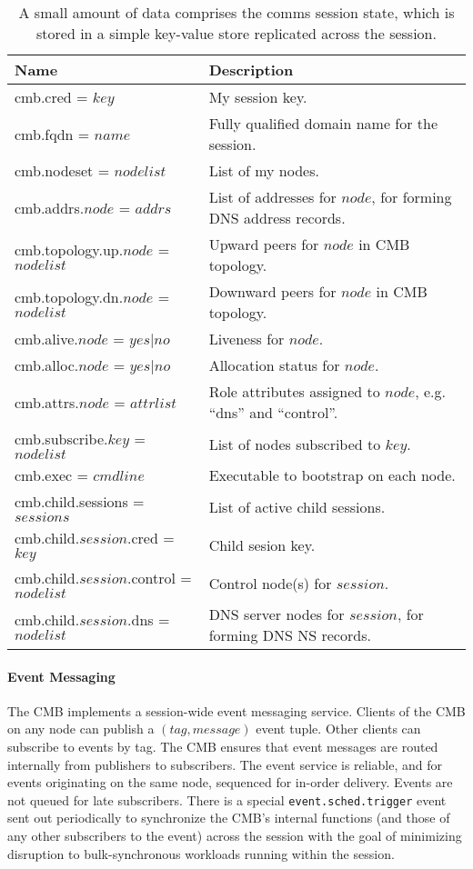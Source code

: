 \begin{table}
  \centering
  \begin{tabular}{| l | p{} |}\hline
  \textbf{Name} & \textbf{Description} \\
  \hline
  cmb.cred = $key$ &
        My session key.\\
  cmb.fqdn = $name$ &
        Fully qualified domain name for the session.\\
  cmb.nodeset = $nodelist$ &
        List of my nodes.\\
  cmb.addrs.$node$ = $addrs$ &
        List of addresses for $node$, for forming DNS address records.\\
  cmb.topology.up.$node$ = $nodelist$ & 
        Upward peers for $node$ in CMB topology.\\
  cmb.topology.dn.$node$ = $nodelist$ &
        Downward peers for $node$ in CMB topology.\\
  cmb.alive.$node$ = $yes|no$ &
        Liveness for $node$.\\
  cmb.alloc.$node$ = $yes|no$ &
        Allocation status for $node$.\\
  cmb.attrs.$node$ = $attrlist$ &
	Role attributes assigned to $node$, e.g. ``dns'' and ``control''.\\
  cmb.subscribe.$key$ = $nodelist$ &
        List of nodes subscribed to $key$.\\
  cmb.exec = $cmdline$ &
        Executable to bootstrap on each node.\\
  \hline
  cmb.child.sessions = $sessions$ &
        List of active child sessions.\\
  cmb.child.$session$.cred = $key$ &
        Child sesion key.\\
  cmb.child.$session$.control = $nodelist$ &
        Control node(s) for $session$.\\
  cmb.child.$session$.dns = $nodelist$ &
        DNS server nodes for $session$, for forming DNS NS records.\\
  \hline
  \end{tabular}
  \caption{A small amount of data comprises the comms session state,
	   which is stored in a simple key-value store replicated across
	   the session.}
  \label{TabCMBState}
\end{table}

\paragraph{Event Messaging}
The CMB implements a session-wide event messaging service.
Clients of the CMB on any node can publish a $(tag, message)$ event tuple.
Other clients can subscribe to events by tag.  The CMB ensures that
event messages are routed internally from publishers to subscribers.
The event service is reliable, and for events originating on the same node,
sequenced for in-order delivery.
Events are not queued for late subscribers.
There is a special {\tt event.sched.trigger} event sent out periodically
to synchronize the CMB's internal functions (and those of any other
subscribers to the event) across the session with the goal of minimizing
disruption to bulk-synchronous workloads running within the session.

